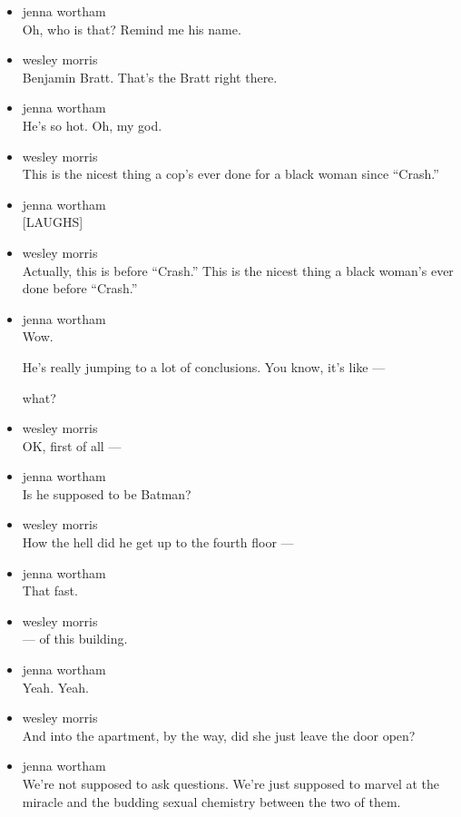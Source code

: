 \begin{itemize}
\item
  jenna wortham\\
  Oh, who is that? Remind me his name.
\item
  wesley morris\\
  Benjamin Bratt. That's the Bratt right there.
\item
  jenna wortham\\
  He's so hot. Oh, my god.
\item
  wesley morris\\
  This is the nicest thing a cop's ever done for a black woman since
  ``Crash.''
\item
  jenna wortham\\
  {[}LAUGHS{]}
\item
  wesley morris\\
  Actually, this is before ``Crash.'' This is the nicest thing a black
  woman's ever done before ``Crash.''
\item
  jenna wortham\\
  Wow.

  He's really jumping to a lot of conclusions. You know, it's like ---

  what?
\item
  wesley morris\\
  OK, first of all ---
\item
  jenna wortham\\
  Is he supposed to be Batman?
\item
  wesley morris\\
  How the hell did he get up to the fourth floor ---
\item
  jenna wortham\\
  That fast.
\item
  wesley morris\\
  --- of this building.
\item
  jenna wortham\\
  Yeah. Yeah.
\item
  wesley morris\\
  And into the apartment, by the way, did she just leave the door open?
\item
  jenna wortham\\
  We're not supposed to ask questions. We're just supposed to marvel at
  the miracle and the budding sexual chemistry between the two of them.


\end{itemize}
